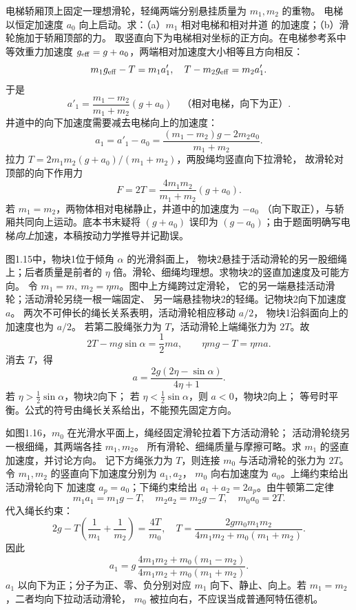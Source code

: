 电梯轿厢顶上固定一理想滑轮，轻绳两端分别悬挂质量为 $m_1,m_2$ 的重物。
电梯以恒定加速度 $a_0$ 向上启动。求：（a）$m_1$ 相对电梯和相对井道
的加速度；（b）滑轮施加于轿厢顶部的力。
\exsolution
取竖直向下为电梯相对坐标的正方向。在电梯参考系中等效重力加速度
$g_{\rm eff}=g+a_0$，两端相对加速度大小相等且方向相反：
\[
m_1g_{\rm eff}-T=m_1a'_1,\quad
T-m_2g_{\rm eff}=m_2a'_1 .
\]
于是
\[
\boxed{a'_1=\frac{m_1-m_2}{m_1+m_2}(g+a_0)}
\quad\text{（相对电梯，向下为正）}.
\]
井道中的向下加速度需要减去电梯向上的加速度：
\[
\boxed{a_1=a'_1-a_0
 =\frac{(m_1-m_2)g-2m_2a_0}{m_1+m_2}}.
\]
拉力 $T=2m_1m_2(g+a_0)/(m_1+m_2)$，两股绳均竖直向下拉滑轮，
故滑轮对顶部的向下作用力
\[
\boxed{F=2T=\frac{4m_1m_2}{m_1+m_2}(g+a_0)}.
\]
\excheck 若 $m_1=m_2$，两物体相对电梯静止，井道中的加速度为 $-a_0$
（向下取正），与轿厢共同向上运动。底本书末疑将 $(g+a_0)$ 误印为
$(g-a_0)$；由于题面明确写电梯\emph{向上}加速，本稿按动力学推导并记勘误。

图1.15中，物块1位于倾角 $\alpha$ 的光滑斜面上，
物块2悬挂于活动滑轮的另一股细绳上；后者质量是前者的
$\eta$ 倍。滑轮、细绳均理想。求物块2的竖直加速度及可能方向。
\exsolution
令 $m_1=m,\ m_2=\eta m$。图中上方绳跨过定滑轮，
它的另一端悬挂活动滑轮；活动滑轮另绕一根一端固定、
另一端悬挂物块2的轻绳。记物块2向下加速度 $a$。
两次不可伸长的绳长关系表明，活动滑轮相应移动 $a/2$，
物块1沿斜面向上的加速度也为 $a/2$。
若第二股绳张力为 $T$，活动滑轮上端绳张力为 $2T$。故
\[
2T-mg\sin\alpha=\frac12ma,\qquad
\eta mg-T=\eta ma.
\]
消去 $T$，得
\[
\boxed{a=\frac{2g(2\eta-\sin\alpha)}{4\eta+1}}.
\]
\excheck 若 $\eta>\tfrac12\sin\alpha$，物块2向下；
若 $\eta<\tfrac12\sin\alpha$，则 $a<0$，物块2向上；
等号时平衡。公式的符号由绳长关系给出，不能预先固定方向。

如图1.16，$m_0$ 在光滑水平面上，绳经固定滑轮拉着下方活动滑轮；
活动滑轮绕另一根细绳，其两端各挂 $m_1,m_2$。
所有滑轮、细绳质量与摩擦可略。求 $m_1$ 的竖直加速度，并讨论方向。
\exsolution
记下方绳张力为 $T$，则连接 $m_0$ 与活动滑轮的张力为 $2T$。
令 $m_1,m_2$ 的竖直向下加速度分别为 $a_1,a_2$，
$m_0$ 向右加速度为 $a_0$。上绳约束给出活动滑轮向下
加速度 $a_p=a_0$；下绳约束给出 $a_1+a_2=2a_p$。由牛顿第二定律
\[
m_1a_1=m_1g-T,\quad m_2a_2=m_2g-T,\quad
m_0a_0=2T.
\]
代入绳长约束：
\[
2g-T\left(\frac1{m_1}+\frac1{m_2}\right)=\frac{4T}{m_0},
\quad
T=\frac{2gm_0m_1m_2}
 {4m_1m_2+m_0(m_1+m_2)}.
\]
因此
\[
\boxed{a_1=
g\,\frac{4m_1m_2+m_0(m_1-m_2)}
 {4m_1m_2+m_0(m_1+m_2)}}.
\]
\excheck $a_1$ 以向下为正；分子为正、零、负分别对应
$m_1$ 向下、静止、向上。若 $m_1=m_2$，二者均向下拉动活动滑轮，
$m_0$ 被拉向右，不应误当成普通阿特伍德机。

